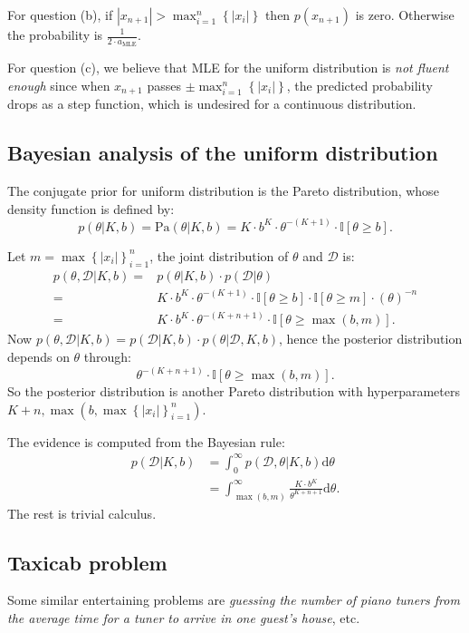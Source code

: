 \documentclass[UTF8]{ctexart}
\begin{document}
For question (b), if $|x_{n+1}| > \max_{i=1}^{n}\left\{ |x_{i}| \right\}$ then $p(x_{n+1})$ is zero. 
Otherwise the probability is $\frac{1}{2\cdot a_{\text{MLE}}}$.

For question (c), we believe that MLE for the uniform distribution is \emph{not fluent enough} since when $x_{n+1}$ passes $\pm\max_{i=1}^{n}\left\{ |x_{i}| \right\}$, the predicted probability drops as a step function, which is undesired for a continuous distribution. 


\subsection{Bayesian analysis of the uniform distribution}
The conjugate prior for uniform distribution is the Pareto distribution, whose density function is defined by:
$$p(\theta|K,b)=\text{Pa}(\theta|K,b)=K\cdot b^{K}\cdot\theta^{-(K+1)}\cdot\mathbb{I}[\theta \geq b].$$

Let $m=\max\left\{|x_{i}|\right\}_{i=1}^{n}$, the joint distribution of $\theta$ and $\mathcal{D}$ is:
$$
\begin{aligned}
p(\theta,\mathcal{D}|K,b) =& p(\theta|K,b)\cdot p(\mathcal{D}|\theta)\\
=& K\cdot b^{K}\cdot \theta^{-(K+1)}\cdot \mathbb{I}[\theta \geq b]\cdot\mathbb{I}[\theta \geq m]\cdot (\theta)^{-n}\\
=&K\cdot b^{K}\cdot\theta^{-(K+n+1)}\cdot\mathbb{I}[\theta\geq \max(b,m)].
\end{aligned}
$$
Now $p(\theta,\mathcal{D}|K,b)=p(\mathcal{D}|K,b)\cdot p(\theta|\mathcal{D},K,b)$, hence the posterior distribution depends on $\theta$ through:
$$\theta^{-(K+n+1)}\cdot\mathbb{I}[\theta\geq \max(b,m)].$$
So the posterior distribution is another Pareto distribution with hyperparameters $K+n,\max(b,\max\left\{|x_{i}|\right\}_{i=1}^{n})$.

The evidence is computed from the Bayesian rule:
$$
\begin{aligned}
p(\mathcal{D}|K,b)&=\int_{0}^{\infty} p(\mathcal{D},\theta|K,b) \text{d}\theta\\
&=\int_{\max(b,m)}^{\infty}\frac{K\cdot b^{K}}{\theta^{K+n+1}}\text{d}\theta.
\end{aligned}
$$
The rest is trivial calculus. 


\subsection{Taxicab problem}
Some similar entertaining problems are \emph{guessing the number of piano tuners from the average time for a tuner to arrive in one guest's house}, etc. 
\end{document}
